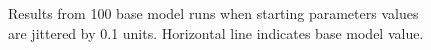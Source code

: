 \documentclass[
]{scrartcl}
\begin{document}
\begin{figure}


\caption{\label{fig-full-jitter}Results from 100 base model runs when
starting parameters values are jittered by 0.1 units. Horizontal line
indicates base model value.}

\end{figure}%
\end{document}
